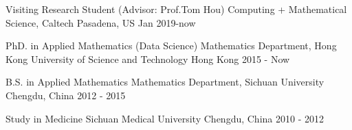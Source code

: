 \begin{cventries}
      \cventry
    {Visiting Research Student (Advisor: Prof.Tom Hou)}
    {Computing + Mathematical Science, Caltech}
    {Pasadena, US}
    {Jan 2019-now}
    {}
    
     \cventry
    {PhD. in Applied Mathematics (Data Science)}
    {Mathematics Department, Hong Kong University of Science and Technology}
    {Hong Kong}
    {2015 - Now}
    { }


     \cventry
    {B.S. in Applied Mathematics}
    {Mathematics Department, Sichuan University}
    {Chengdu, China}
    {2012 - 2015}
    { }



  \cventry
    {Study in Medicine}
    {Sichuan Medical University}
    {Chengdu, China}
    {2010 - 2012}
    {
    }

    
    
    
    
    
    
\end{cventries}

